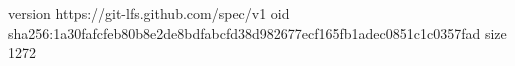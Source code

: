 version https://git-lfs.github.com/spec/v1
oid sha256:1a30fafcfeb80b8e2de8bdfabcfd38d982677ecf165fb1adec0851c1c0357fad
size 1272
